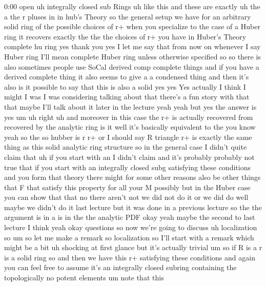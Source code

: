 \begin{unfinished}{0:00}
open  uh  integrally  closed  sub
Rings  uh  like  this  and  these  are
exactly  uh  the  a  the  r  pluses  in  in
hub's
Theory
so  the  general  setup  we  have  for  an
arbitrary  solid  ring  of  the  possible
choices  of  r+  when  you  specialize  to  the
case  of  a  Huber  ring  it  recovers  exactly
the  the  the  choices  of  r+  you  have  in
Huber's  Theory  complete  hu  ring  yes
thank  you  yes  I  let  me  say  that  from  now
on  whenever  I  say  Huber  ring  I'll  mean
complete  Huber  ring  unless  otherwise
specified  so  so  there  is  also  sometimes
people  use  SoCal  derived  comp  complete
things  and  if  you  have  a  derived
complete  thing  it  also  seems  to  give  a  a
condensed  thing  and  then  it's  also  is  it
possible  to  say  that  this  is  also  a
solid  yes  yes  Yes  actually  I  think  I
might  I  was  I  was  considering  talking
about  that  there's  a  fun  story  with  that
that  maybe  I'll  talk  about  it  later  in
the  lecture  yeah  yeah  but  yes  the  answer
is  yes
um  uh  right  uh  and
moreover  in  this  case  the  r+  is  actually
recovered
from  recovered  by  the  analytic
ring  is  it  well  it's  basically
equivalent  to  the  you  know  yeah  so  the
so  hubber  is  r  r+  or  I  should  say  R
triangle  r+  is  exactly  the  same  thing  as
this  solid  analytic  ring
structure  so  in  the  general  case  I
didn't  quite  claim
that  uh  if  you  start  with  an  I  didn't
claim  and  it's  probably  probably  not
true  that  if  you  start  with  an
integrally  closed  subg  satisfying  these
conditions  and  you  form  that  theory
there  might  for  some  other  reasons  also
be  other  things  that  F  that  satisfy  this
property  for  all  your  M  possibly  but  in
the  Huber  case  you  can  show  that  that  no
there  aren't  not  we  did  not  do  it  or  we
did  do  well  maybe  we  didn't  do  it  last
lecture  but  it  was  done  in  a  previous
lecture  so  the  the  argument  is  in  a  is
in  the  the  analytic  PDF
okay  yeah  maybe  the  second  to  last
lecture  I
think
yeah
okay
questions
so  now  we're  going  to  discuss  uh
localization
so  um  so  let  me  make  a  remark  so
localization  so  I'll  start  with  a  remark
which  might  be  a  bit  uh  shocking  at
first  glance  but  it's  actually  trivial
um  so  if  R  is
a  r  is  a  solid  ring
so  and  then  we  have  this
r+  satisfying  these  conditions  and  again
you  can  feel  free  to  assume  it's  an
integrally  closed  subring  containing  the
topologically  no  potent
elements  um  note  that  this

\end{unfinished}
